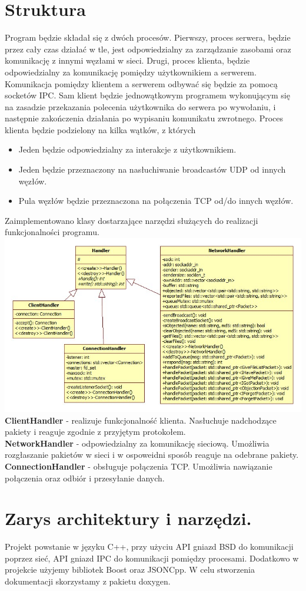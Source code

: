 \documentclass[10pt,a4paper]{article}
\begin{document}
\section{Struktura}
Program będzie składał się z dwóch procesów. Pierwszy, proces serwera, będzie przez cały czas działać w tle, jest odpowiedzialny za zarządzanie zasobami oraz komunikację z innymi węzłami w sieci.
Drugi, proces klienta, będzie odpowiedzialny za komunikację pomiędzy użytkownikiem a serwerem. Komunikacja pomiędzy klientem a serwerem odbywać się będzie za pomocą socketów IPC. Sam klient będzie jednowątkowym programem wykonującym się na zasadzie przekazania polecenia użytkownika do serwera po wywołaniu, i następnie zakończenia działania po wypisaniu komunikatu zwrotnego.
Proces klienta będzie podzielony na kilka wątków, z których
\begin{itemize}
\item Jeden będzie odpowiedzialny za interakcje z użytkownikiem.
\item Jeden będzie przeznaczony na nasłuchiwanie broadcastów UDP od innych węzłów.
\item Pula węzłów będzie przeznaczona na połączenia TCP od/do innych węzłów.
\end{itemize}
Zaimplementowano klasy dostarzające narzędzi służących do realizacji funkcjonalności programu. \\
\includegraphics[width=\linewidth]{handler}
\textbf{ClientHandler} - realizuje funkcjonalność klienta. Nasłuchuje nadchodzące pakiety i reaguje zgodnie z przyjętym protokołem. \\
\textbf{NetworkHandler} - odpowiedzialny za komunikację sieciową. Umożliwia rozgłaszanie pakietów w sieci i w ospoweidni sposób reaguje na odebrane pakiety. \\
\textbf{ConnectionHandler} - obsługuje połączenia TCP. Umożliwia nawiązanie połączenia oraz odbiór i przesyłanie danych. \\


\section{ Zarys architektury i narzędzi.}
Projekt powstanie w języku C++, przy użyciu API gniazd BSD do komunikacji poprzez sieć, API gniazd IPC do komunikacji pomiędzy procesami. Dodatkowo w projekcie użyjemy bibliotek Boost oraz JSONCpp. W celu stworzenia dokumentacji skorzystamy z pakietu doxygen.
\end{document}
